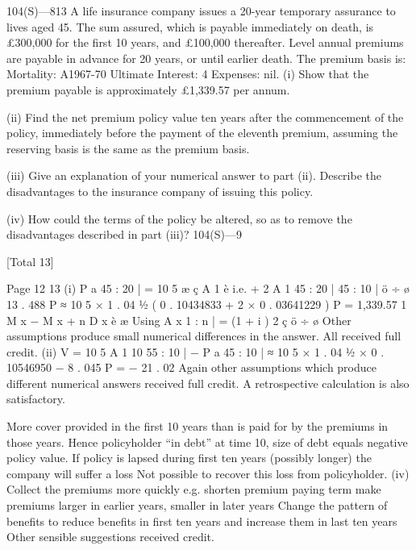 \documentclass[a4paper,12pt]{article}
\begin{document}
104(S)—813
A life insurance company issues a 20-year temporary assurance to lives aged 45.
The sum assured, which is payable immediately on death, is £300,000 for the
first 10 years, and £100,000 thereafter. Level annual premiums are payable in
advance for 20 years, or until earlier death.
The premium basis is:
Mortality: A1967-70 Ultimate
Interest: 4%
Expenses: nil.
(i) Show that the premium payable is approximately £1,339.57 per annum.

(ii) Find the net premium policy value ten years after the commencement of
the policy, immediately before the payment of the eleventh premium,
assuming the reserving basis is the same as the premium basis.

(iii) Give an explanation of your numerical answer to part (ii). Describe the
disadvantages to the insurance company of issuing this policy.

(iv) How could the terms of the policy be altered, so as to remove the
disadvantages described in part (iii)?
104(S)—9

[Total 13]


Page 12%
13
(i)
P a   45 : 20 | = 10 5 æ ç A 1
è
i.e.
+ 2 A 1
45 : 20 |
45 : 10 |
ö
÷
ø
13 . 488 P ≈ 10 5 × 1 . 04 1⁄2 ( 0 . 10434833 + 2 × 0 . 03641229 )
P = 1,339.57
1
M x − M x + n
D x
è
æ
Using A x 1 : n | = (1 + i ) 2 ç
ö
÷
ø
Other assumptions produce small numerical differences in the answer. All
received full credit.
(ii)
V = 10 5 A 1
10
55 : 10 |
− P a   45 : 10 | ≈ 10 5 × 1 . 04 1⁄2 × 0 . 10546950 − 8 . 045 P = − 21 . 02
Again other assumptions which produce different numerical answers
received full credit.
A retrospective calculation is also satisfactory.

More cover provided in the first 10 years than is paid for by the premiums
in those years.
Hence policyholder “in debt” at time 10, size of debt equals negative policy
value.
If policy is lapsed during first ten years (possibly longer) the company will
suffer a loss
Not possible to recover this loss from policyholder.
(iv)
Collect the premiums more quickly
e.g. shorten premium paying term
make premiums larger in earlier years, smaller in later years
Change the pattern of benefits to reduce benefits in first ten years and
increase them in last ten years
Other sensible suggestions received credit.
\end{document}

